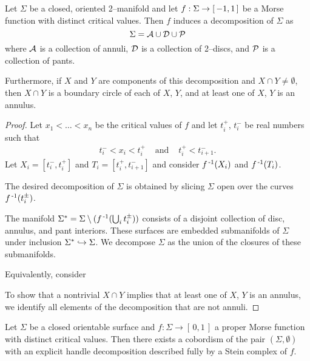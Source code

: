 \begin{lem}
	\label{lem:sigmadecomp}
	Let $\Sigma$ be a closed, oriented 2--manifold and let $f:\Sigma\to[\,-1,1\,]$ be a Morse function with distinct critical values.
	Then $f$ induces a decomposition of $\Sigma$ as
	\[
		\Sigma=\mathcal{A}\cup \mathcal{D}\cup \mathcal{P}
	\]
	where $\mathcal{A}$ is a collection of annuli, $\mathcal{D}$ is a collection of 2--discs, and $\mathcal{P}$ is a collection of pants.
	
	Furthermore, if $X$ and $Y$ are components of this decomposition and $X\cap Y\neq\emptyset$, then $X\cap Y$ is a boundary circle of each of $X$, $Y$, and at least one of $X$, $Y$ is an annulus.
\end{lem}

\begin{proof}
	Let $x_1<\dots<x_n$ be the critical values of $f$ and let $t_i^+$, $t_i^-$ be real numbers such that
	\[
		\begin{array}{ccc}
			t_i^-<x_i<t_i^+ & \textrm{ and } & t_i^+<t_{i+1}^-. 		
		\end{array}
	\]
	Let $X_i=[t_i^-,t_i^+]$ and $T_i=[t_i^+,t_{i+1}^-]$ and consider $f^{\,\text{-}1}(X_i)$ and $f^{\,\text{-}1}(T_i)$.
	
	
	
	
	
	
	The desired decomposition of $\Sigma$ is obtained by slicing $\Sigma$ open over the curves $f^{\,\text{-}1}(t_i^\pm)$.
	
	The manifold $\Sigma^*=\Sigma\setminus(f^{\,\text{-}1}(\bigcup_i t_i^\pm))$ consists of a disjoint collection of disc, annulus, and pant interiors.
	These surfaces are embedded submanifolds of $\Sigma$ under inclusion $\Sigma^*\hookrightarrow \Sigma$.
	We decompose $\Sigma$ as the union of the closures of these submanifolds.
	
	Equivalently, consider
	
	
	To show that a nontrivial $X\cap Y$ implies that at least one of $X$, $Y$ is an annulus, we identify all elements of the decomposition that are not annuli.
	
	
	
\end{proof}

\begin{theorem}
	\label{thm:2bound3}
	Let $\Sigma$ be a closed orientable surface and $f:\Sigma\to[\,0,1\,]$ a proper Morse function with distinct critical values.
	Then there exists a cobordism of the pair $(\Sigma,\emptyset)$ with an explicit handle decomposition described fully by a Stein complex of $f$.
\end{theorem}

